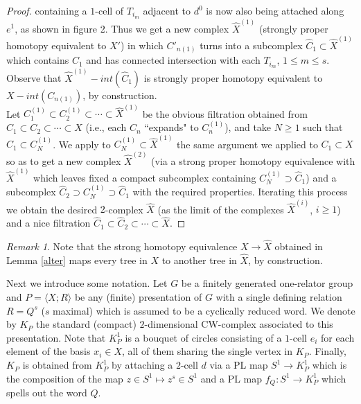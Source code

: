 \documentclass{amsart}[12pt]
\theoremstyle{definition}
\theoremstyle{remark}
\newtheorem{remark}[theorem]{Remark}
\numberwithin{equation}{section}
\begin{document}
\begin{proof}
containing a $1$-cell of $T_{i_m}$ adjacent to $d^0$ is now also
being attached along $e^1$, as shown in figure 2. Thus we get a
new complex $\widehat{X}^{(1)}$ (strongly proper homotopy
equivalent to $X'$) in which $C'_{n(1)}$ turns into a subcomplex
$\widehat{C}_1 {\subset} \widehat{X}^{(1)}$ which contains $C_1$ and
has connected intersection with each $T_{i_m}$, $1 \leq m \leq s$.
Observe that $\widehat{X}^{(1)} - int(\widehat{C}_1)$ is strongly
proper homotopy equivalent to $X - int(C_{n(1)})$, by construction.\\
\indent Let $C^{(1)}_1 {\subset} C^{(1)}_2 {\subset} \cdots {\subset}
\widehat{X}^{(1)}$ be the obvious filtration obtained from $C_1
{\subset} C_2 {\subset} \cdots {\subset} X$ (i.e., each $C_n$ ``expands" to
$C^{(1)}_n$), and take $N \geq 1$ such that $\widehat{C}_1 {\subset}
C^{(1)}_N$. We apply to $C^{(1)}_N {\subset} \widehat{X}^{(1)}$ the
same argument we applied to $C_1 {\subset} X$ so as to get a new
complex $\widehat{X}^{(2)}$ (via a strong proper homotopy
equivalence with $\widehat{X}^{(1)}$ which leaves fixed a compact
subcomplex containing $C^{(1)}_N \supset \widehat{C}_1$) and a
subcomplex $\widehat{C}_2 \supset C^{(1)}_N \supset \widehat{C}_1$
with the required properties. Iterating this process we obtain the
desired $2$-complex $\widehat{X}$ (as the limit of the complexes
$\widehat{X}^{(i)}$, $i \geq 1$) and a nice filtration
$\widehat{C}_1 {\subset} \widehat{C}_2 {\subset} \cdots {\subset} \widehat{X}$.
\end{proof}
\begin{remark} \label{tree-condition}
Note that the strong homotopy equivalence $X {\longrightarrow} \widehat{X}$
obtained in Lemma \ref{alter} maps every tree in $X$ to another
tree in $\widehat{X}$, by construction.
\end{remark}
\indent Next we introduce some notation. Let $G$ be a finitely
generated one-relator group and $P=\langle X;R \rangle$ be any
(finite) presentation of $G$ with a single defining relation
$R=Q^s$ ($s$ maximal) which is assumed to be a cyclically reduced
word. We denote by $K_P$ the standard (compact) $2$-dimensional
CW-complex associated to this presentation. Note that $K_P^1$ is a
bouquet of circles consisting of a $1$-cell $e_i$ for each element
of the basis $x_i \in X$, all of them sharing the single vertex in
$K_P$. Finally, $K_P$ is obtained from $K_P^1$ by attaching a
$2$-cell $d$ via a PL map $S^1 {\longrightarrow} K_P^1$ which is the
composition of the map $z \in S^1 \mapsto z^s \in S^1$ and a PL
map $f_Q : S^1 {\longrightarrow} K_P^1$ which spells out the word $Q$.
\end{document}
